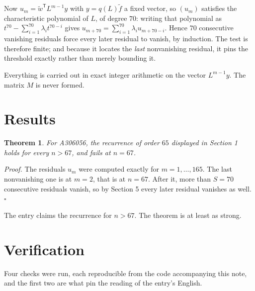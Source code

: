 \documentclass[11pt]{article}
\newtheorem{theorem}{Theorem}
\theoremstyle{definition}
\begin{document}
Now $u_m = \tilde w^{\mathsf T} L^{m-1} y$ with $y = q(L)\tilde f$ a fixed vector, so $(u_m)$ satisfies the characteristic polynomial of $L$, of degree $70$: writing that polynomial as $t^{70} - \sum_{i=1}^{70} \lambda_i t^{70-i}$ gives $u_{m+70} = \sum_{i=1}^{70} \lambda_i u_{m+70-i}$. Hence $70$ consecutive vanishing residuals force every later residual to vanish, by induction. The test is therefore finite; and because it locates the {\itshape last} nonvanishing residual, it pins the threshold exactly rather than merely bounding it.

Everything is carried out in exact integer arithmetic on the vector $L^{m-1}y$. The matrix $M$ is never formed.

\section{Results}

\begin{theorem} For A306056, the recurrence of order $65$ displayed in Section 1 holds for every $n > 67$, and fails at $n = 67$.\end{theorem}

{\itshape Proof.} The residuals $u_m$ were computed exactly for $m = 1,\dots,165$. The last nonvanishing one is at $m = 2$, that is at $n = 67$. After it, more than $S = 70$ consecutive residuals vanish, so by Section 5 every later residual vanishes as well. $\square$

The entry claims the recurrence for $n > 67$. The theorem is at least as strong.

\section{Verification}

Four checks were run, each reproducible from the code accompanying this note, and the first two are what pin the reading of the entry's English.
\end{document}
